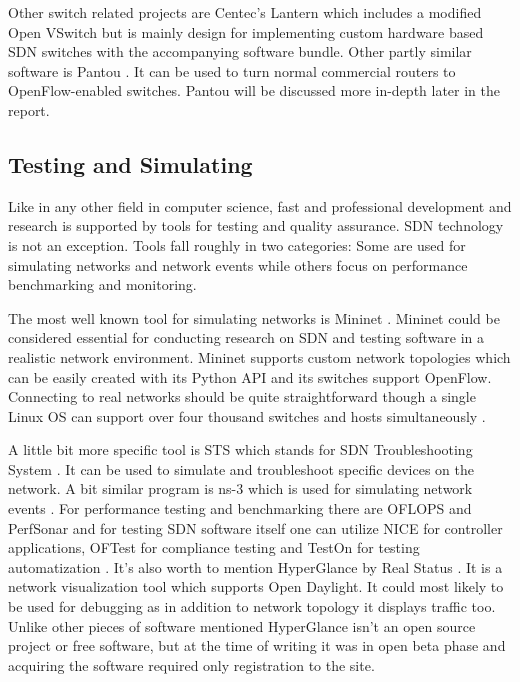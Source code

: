 Other switch related projects are Centec’s Lantern \cite{Lantern} which includes a modified Open VSwitch but is mainly design for implementing custom  hardware based SDN switches with the accompanying software bundle. Other partly similar software is Pantou \cite{Yia04}. It can be used to turn normal commercial routers to OpenFlow-enabled switches. Pantou will be discussed more in-depth later in the report.

\subsection{Testing and Simulating}

Like in any other field in computer science, fast and professional development and research is supported by tools for testing and quality assurance. SDN technology is not an exception. Tools fall roughly in two categories: Some are used for simulating networks and network events while others focus on performance benchmarking and monitoring.

The most well known tool for simulating networks is Mininet \cite{MN14}. Mininet could be considered essential for conducting research on SDN and testing software in a realistic network environment. Mininet supports custom network topologies which can be easily created with its Python API and its switches support OpenFlow. Connecting to real networks should be quite straightforward though a single Linux OS can support  over four thousand switches and hosts simultaneously \cite{MN14}. 

A little bit more specific tool is STS which stands for SDN Troubleshooting System \cite{STS}. It can be used to simulate and troubleshoot specific devices on the network. A bit similar program is ns-3 which is used for simulating network events \cite{NS3}. For performance testing and benchmarking there are OFLOPS and PerfSonar \cite{OFLOPS, Perf} and for testing SDN software itself one can utilize NICE \cite{NICE} for controller applications, OFTest for compliance testing \cite{OFTest} and TestOn for testing automatization \cite{TestOn}. It’s also worth to mention HyperGlance by Real Status \cite{Hyper}. It is a network visualization tool which supports Open Daylight. It could most likely to be used for debugging as in addition to network topology it displays traffic too. Unlike other pieces of software mentioned HyperGlance isn’t an open source project or free software, but at the time of writing it was in open beta phase and acquiring the software required only registration to the site.

